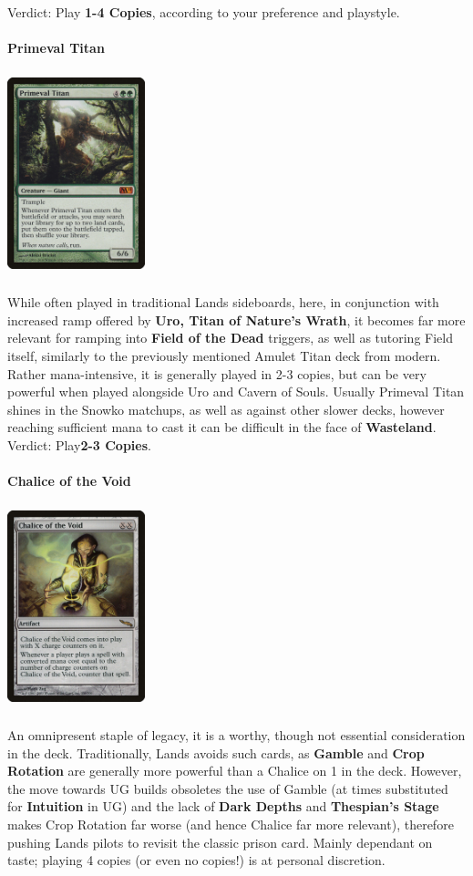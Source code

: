 \documentclass{report}
\begin{document}
Verdict: Play \textbf{1-4 Copies}, according to your preference and playstyle.\\\\
\textbf{Primeval Titan}
\begin{center}
\includegraphics [width = 4cm, height = 6cm] {primeval-titan}
\end{center}
While often played in traditional Lands sideboards, here, in conjunction with increased ramp offered by \textbf{Uro, Titan of Nature's Wrath}, it becomes far more relevant for ramping into \textbf{Field of the Dead} triggers, as well as tutoring Field itself, similarly to the previously mentioned Amulet Titan deck from modern. Rather mana-intensive, it is generally played in 2-3 copies, but can be very powerful when played alongside Uro and Cavern of Souls. Usually Primeval Titan shines in the Snowko matchups, as well as against other slower decks, however reaching sufficient mana to cast it can be difficult in the face of \textbf{Wasteland}.
Verdict: Play\textbf{2-3 Copies}.\\\\
\textbf{Chalice of the Void}
\begin{center}
\includegraphics [width = 4cm, height = 6cm] {chalice-of-the-void}
\end{center}
An omnipresent staple of legacy, it is a worthy, though not essential consideration in the deck. Traditionally, Lands avoids such cards, as \textbf{Gamble} and \textbf{Crop Rotation} are generally more powerful than a Chalice on 1 in the deck. However, the move towards UG builds obsoletes the use of Gamble (at times substituted for \textbf{Intuition} in UG) and the lack of \textbf{Dark Depths} and \textbf{Thespian's Stage} makes Crop Rotation far worse (and hence Chalice far more relevant), therefore pushing Lands pilots to revisit the classic prison card. Mainly dependant on taste; playing 4 copies (or even no copies!) is at personal discretion.\\
\end{document}

